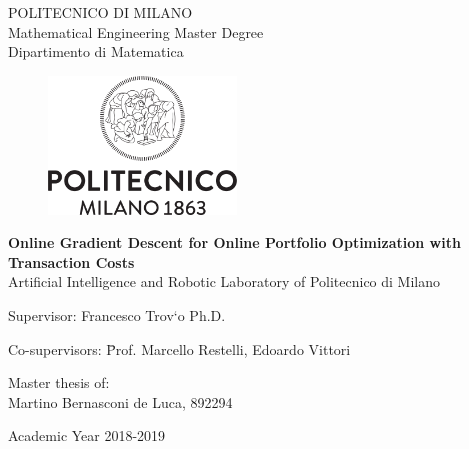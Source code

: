 \thispagestyle{empty}
\vspace*{-1.5cm}
 \bfseries{
\begin{center}
  \large
  POLITECNICO DI MILANO\\
  \normalsize
  Mathematical Engineering Master Degree\\
  Dipartimento di Matematica\\
  \begin{figure}[htbp]
    \begin{center}
      \includegraphics[width=5cm]{./img/logo/Logo_Politecnico_Milano.png}
    \end{center}
  \end{figure}
  \vspace*{0.1cm} \LARGE


    \textbf{Online Gradient Descent for Online Portfolio Optimization with Transaction Costs}\\


  \vspace*{.75truecm} \large
  Artificial Intelligence and Robotic Laboratory \newline of Politecnico di Milano
\end{center}
\vspace*{2.0cm} \large
\begin{flushleft}


  Supervisor: Francesco Trov\a`{o} Ph.D. \\

  \begin{tabbing}  
      Co-supervisors: \= Prof. Marcello Restelli,
      Edoardo Vittori
  \end{tabbing}
\end{flushleft}
\vspace*{1.0cm}
\begin{flushright}


  Master thesis of:\\ Martino Bernasconi de Luca, 892294\\


\end{flushright}
\vspace*{0.8cm}
\begin{center}

  Academic Year 2018-2019 %
\end{center} \clearpage
}
